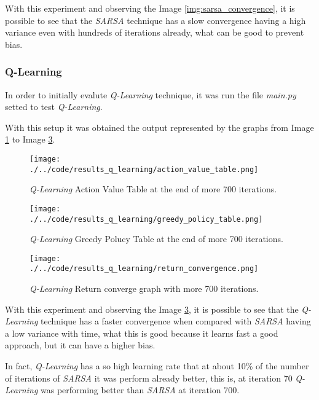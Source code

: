 \documentclass[journal]{IEEEtran}
\begin{document}
With this experiment and observing the Image \ref{img:sarsa_convergence}, it is possible to see that the \textit{SARSA} technique has a slow convergence having a high variance even with hundreds of iterations already, what can be good to prevent bias.

\subsubsection{Q-Learning}
In order to initially evalute \textit{Q-Learning} technique, it was run the file \textit{main.py} setted to test \textit{Q-Learning}.

With this setup it was obtained the output represented by the graphs from Image \ref{img:qlearning_action} to Image \ref{img:qlearning_convergence}.

\begin{figure}
  \begin{center}
  \texttt{[image: ./../code/results\_q\_learning/action\_value\_table.png]}
  \caption{\textit{Q-Learning} Action Value Table at the end of more 700 iterations.}
  \label{img:qlearning_action}
  \end{center}
\end{figure}

\begin{figure}
  \begin{center}
  \texttt{[image: ./../code/results\_q\_learning/greedy\_policy\_table.png]}
  \caption{\textit{Q-Learning} Greedy Polucy Table at the end of more 700 iterations.}
  \label{img:qlearning_greedy}
  \end{center}
\end{figure}

\begin{figure}
  \begin{center}
  \texttt{[image: ./../code/results\_q\_learning/return\_convergence.png]}
  \caption{\textit{Q-Learning} Return converge graph with more 700 iterations.}
  \label{img:qlearning_convergence}
  \end{center}
\end{figure}

With this experiment and observing the Image \ref{img:qlearning_convergence}, it is possible to see that the \textit{Q-Learning} technique has a faster convergence when compared with \textit{SARSA} having a low variance with time, what this is good because it learns fast a good approach, but it can have a higher bias.

In fact, \textit{Q-Learning} has a so high learning rate that at about 10\% of the number of iterations of \textit{SARSA} it was perform already better, this is, at iteration 70 \textit{Q-Learning} was performing better than \textit{SARSA} at iteration 700.
\end{document}
